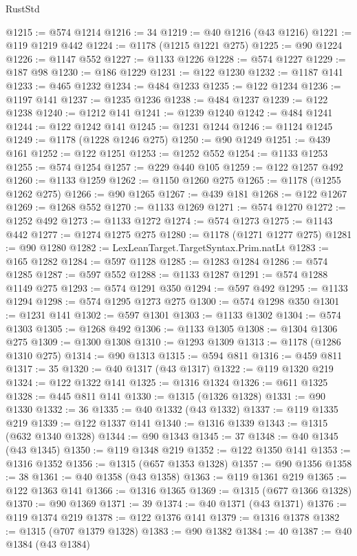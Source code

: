 \begin{lexlean}{RustStd}
\begin{coremodule}
@1215 := @574 @1214
@1216 := 34
@1219 := @40 @1216 (@43 @1216)
@1221 := @119 @1219 @442
@1224 := @1178 (@1215 @1221 @275)
@1225 := @90 @1224
@1226 := @1147 @552
@1227 := @1133 @1226
@1228 := @574 @1227
@1229 := @187 @98
@1230 := @186 @1229
@1231 := @122 @1230
@1232 := @1187 @141
@1233 := @465 @1232
@1234 := @484 @1233
@1235 := @122 @1234
@1236 := @1197 @141
@1237 := @1235 @1236
@1238 := @484 @1237
@1239 := @122 @1238
@1240 := @1212 @141
@1241 := @1239 @1240
@1242 := @484 @1241
@1244 := @122 @1242 @141
@1245 := @1231 @1244
@1246 := @1124 @1245
@1249 := @1178 (@1228 @1246 @275)
@1250 := @90 @1249
@1251 := @439 @161
@1252 := @122 @1251
@1253 := @1252 @552
@1254 := @1133 @1253
@1255 := @574 @1254
@1257 := @229 @440 @105
@1259 := @122 @1257 @492
@1260 := @1133 @1259
@1262 := @1150 @1260 @275
@1265 := @1178 (@1255 @1262 @275)
@1266 := @90 @1265
@1267 := @439 @181
@1268 := @122 @1267
@1269 := @1268 @552
@1270 := @1133 @1269
@1271 := @574 @1270
@1272 := @1252 @492
@1273 := @1133 @1272
@1274 := @574 @1273
@1275 := @1143 @442
@1277 := @1274 @1275 @275
@1280 := @1178 (@1271 @1277 @275)
@1281 := @90 @1280
@1282 := LexLeanTarget.TargetSyntax.Prim.natLt
@1283 := @165 @1282
@1284 := @597 @1128
@1285 := @1283 @1284
@1286 := @574 @1285
@1287 := @597 @552
@1288 := @1133 @1287
@1291 := @574 @1288 @1149 @275
@1293 := @574 @1291 @350
@1294 := @597 @492
@1295 := @1133 @1294
@1298 := @574 @1295 @1273 @275
@1300 := @574 @1298 @350
@1301 := @1231 @141
@1302 := @597 @1301
@1303 := @1133 @1302
@1304 := @574 @1303
@1305 := @1268 @492
@1306 := @1133 @1305
@1308 := @1304 @1306 @275
@1309 := @1300 @1308
@1310 := @1293 @1309
@1313 := @1178 (@1286 @1310 @275)
@1314 := @90 @1313
@1315 := @594 @811
@1316 := @459 @811
@1317 := 35
@1320 := @40 @1317 (@43 @1317)
@1322 := @119 @1320 @219
@1324 := @122 @1322 @141
@1325 := @1316 @1324
@1326 := @611 @1325
@1328 := @445 @811 @141
@1330 := @1315 (@1326 @1328)
@1331 := @90 @1330
@1332 := 36
@1335 := @40 @1332 (@43 @1332)
@1337 := @119 @1335 @219
@1339 := @122 @1337 @141
@1340 := @1316 @1339
@1343 := @1315 (@632 @1340 @1328)
@1344 := @90 @1343
@1345 := 37
@1348 := @40 @1345 (@43 @1345)
@1350 := @119 @1348 @219
@1352 := @122 @1350 @141
@1353 := @1316 @1352
@1356 := @1315 (@657 @1353 @1328)
@1357 := @90 @1356
@1358 := 38
@1361 := @40 @1358 (@43 @1358)
@1363 := @119 @1361 @219
@1365 := @122 @1363 @141
@1366 := @1316 @1365
@1369 := @1315 (@677 @1366 @1328)
@1370 := @90 @1369
@1371 := 39
@1374 := @40 @1371 (@43 @1371)
@1376 := @119 @1374 @219
@1378 := @122 @1376 @141
@1379 := @1316 @1378
@1382 := @1315 (@707 @1379 @1328)
@1383 := @90 @1382
@1384 := 40
@1387 := @40 @1384 (@43 @1384)

\end{coremodule}
\end{lexlean}
